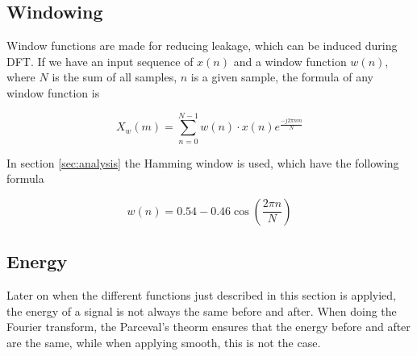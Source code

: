 \subsection{Windowing}
\label{sec:windowing}
Window functions are made for reducing leakage, which can be induced during DFT. If we have an input sequence of $x(n)$ and a window function $w(n)$, where $N$ is the sum of all samples, $n$ is a given sample, the formula of any window function is

\begin{equation}
\label{eq:window}
X_w(m) = \sum_{n=0}^{N-1} w(n)\cdot x(n)e^{\frac{-j2\pi nm}{N}}
\end{equation}

In section \ref{sec:analysis} the Hamming window is used, which have the following formula

\begin{equation}
\label{eq:hamming}
w(n) = 0.54-0.46\cos\left(\frac{2\pi n}{N}\right)
\end{equation}

\subsection{Energy}

Later on when the different functions just described in this section is applyied, the energy of a signal is not always the same before and after. When doing the Fourier transform, the Parceval's theorm ensures that the energy before and after are the same, while when applying smooth, this is not the case. 